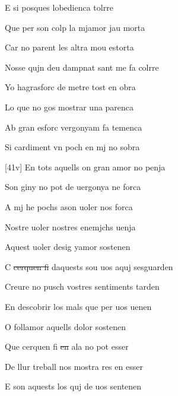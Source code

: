 \documentclass[12pt]{article}
\begin{document}
\begin{estrofa}

 E si posques lobedienca tolrre

 Que per son colp la mjamor jau morta

 Car no parent les altra mou estorta

 Nosse qujn deu dampnat sant me fa colrre

 Yo hagrasforc de metre tost en obra

 Lo que no gos mostrar una parenca

 Ab gran esforc vergonyam fa temenca

 Si cardiment vn poch en mj no sobra

\end{estrofa}



\begin{estrofa}

 [41v] En tots aquells on gran amor no penja

 Son giny no pot de uergonya ne forca

 A mj he pochs ason uoler nos forca

 Nostre uoler nostres enemjchs uenja

 Aquest uoler desig yamor sostenen

 C \sout{cerquen fi} daquests sou uos aquj sesguarden

 Creure no pusch vostres sentiments tarden

 En descobrir los mals que per uos uenen

\end{estrofa}



\begin{estrofa}

 O follamor aquells dolor sostenen

 Que cerquen fi \sout{en} ala  no pot esser

 De llur treball nos mostra res en esser

 E son aquests los quj de uos sentenen

\end{estrofa}
\end{document}

